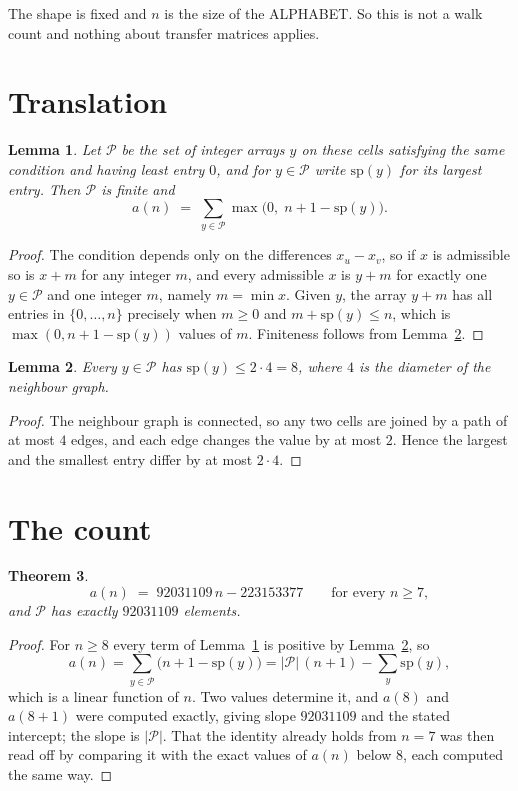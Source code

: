 \documentclass[11pt,a4paper]{article}
\theoremstyle{plain}
\newtheorem{theorem}{Theorem}
\newtheorem{lemma}[theorem]{Lemma}
\theoremstyle{definition}
\begin{document}
The shape is fixed and $n$ is the size of the ALPHABET. So this is not a walk count and
nothing about transfer matrices applies.

\section{Translation}

\begin{lemma}\label{lem:trans}
Let $\mathcal P$ be the set of integer arrays $y$ on these cells satisfying the same condition
and having least entry $0$, and for $y\in\mathcal P$ write $\mathrm{sp}(y)$ for its largest
entry. Then $\mathcal P$ is finite and
\[
a(n)\;=\;\sum_{y\in\mathcal P}\max\bigl(0,\;n+1-\mathrm{sp}(y)\bigr).
\]
\end{lemma}

\begin{proof}
The condition depends only on the differences $x_u-x_v$, so if $x$ is admissible so is $x+m$
for any integer $m$, and every admissible $x$ is $y+m$ for exactly one $y\in\mathcal P$ and one
integer $m$, namely $m=\min x$. Given $y$, the array $y+m$ has all entries in
$\{0,\dots,n\}$ precisely when $m\ge0$ and $m+\mathrm{sp}(y)\le n$, which is
$\max(0,n+1-\mathrm{sp}(y))$ values of $m$. Finiteness follows from
Lemma~\ref{lem:bound}.
\end{proof}

\begin{lemma}\label{lem:bound}
Every $y\in\mathcal P$ has $\mathrm{sp}(y)\le 2\cdot4=8$, where $4$ is the
diameter of the neighbour graph.
\end{lemma}

\begin{proof}
The neighbour graph is connected, so any two cells are joined by a path of at most $4$
edges, and each edge changes the value by at most $2$. Hence the largest and the smallest
entry differ by at most $2\cdot4$.
\end{proof}

\section{The count}

\begin{theorem}\label{thm:line}
\[
a(n)\;=\;92031109\,n-223153377\qquad\text{for every }n\ge7,
\]
and $\mathcal P$ has exactly $92031109$ elements.
\end{theorem}

\begin{proof}
For $n\ge8$ every term of Lemma~\ref{lem:trans} is positive by
Lemma~\ref{lem:bound}, so
\[
a(n)=\sum_{y\in\mathcal P}\bigl(n+1-\mathrm{sp}(y)\bigr)
=|\mathcal P|\,(n+1)-\sum_{y}\mathrm{sp}(y),
\]
which is a linear function of $n$. Two values determine it, and $a(8)$ and
$a(8+1)$ were computed exactly, giving slope $92031109$ and the stated intercept; the slope
is $|\mathcal P|$. That the identity already holds from $n=7$ was then read off by
comparing it with the exact values of $a(n)$ below $8$, each computed the same way.
\end{proof}
\end{document}

